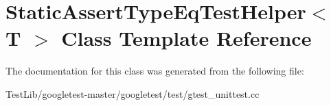 \hypertarget{classStaticAssertTypeEqTestHelper}{}\section{Static\+Assert\+Type\+Eq\+Test\+Helper$<$ T $>$ Class Template Reference}
\label{classStaticAssertTypeEqTestHelper}


The documentation for this class was generated from the following file\+:\begin{DoxyCompactItemize}
\item 
Test\+Lib/googletest-\/master/googletest/test/gtest\+\_\+unittest.\+cc\end{DoxyCompactItemize}
